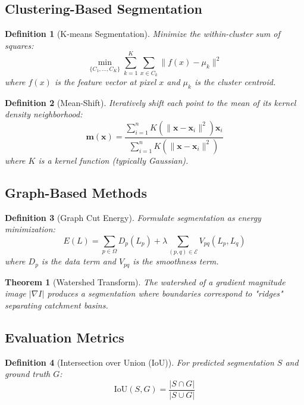 \documentclass[a4paper, 11pt]{article}
\newtheorem{definition}{Definition}[section]
\newtheorem{theorem}{Theorem}[section]
\begin{document}
\subsection{Clustering-Based Segmentation}

\begin{definition}[K-means Segmentation]
Minimize the within-cluster sum of squares:
\begin{equation}
\min_{\{C_1, \ldots, C_K\}} \sum_{k=1}^K \sum_{x \in C_k} \|f(x) - \mu_k\|^2
\end{equation}
where $f(x)$ is the feature vector at pixel $x$ and $\mu_k$ is the cluster centroid.
\end{definition}

\begin{definition}[Mean-Shift]
Iteratively shift each point to the mean of its kernel density neighborhood:
\begin{equation}
\mathbf{m}(\mathbf{x}) = \frac{\sum_{i=1}^n K(\|\mathbf{x} - \mathbf{x}_i\|^2) \mathbf{x}_i}{\sum_{i=1}^n K(\|\mathbf{x} - \mathbf{x}_i\|^2)}
\end{equation}
where $K$ is a kernel function (typically Gaussian).
\end{definition}

\subsection{Graph-Based Methods}

\begin{definition}[Graph Cut Energy]
Formulate segmentation as energy minimization:
\begin{equation}
E(L) = \sum_{p \in \Omega} D_p(L_p) + \lambda \sum_{(p,q) \in \mathcal{E}} V_{pq}(L_p, L_q)
\end{equation}
where $D_p$ is the data term and $V_{pq}$ is the smoothness term.
\end{definition}

\begin{theorem}[Watershed Transform]
The watershed of a gradient magnitude image $|\nabla I|$ produces a segmentation where
boundaries correspond to "ridges" separating catchment basins.
\end{theorem}

\subsection{Evaluation Metrics}

\begin{definition}[Intersection over Union (IoU)]
For predicted segmentation $S$ and ground truth $G$:
\begin{equation}
\text{IoU}(S, G) = \frac{|S \cap G|}{|S \cup G|}
\end{equation}
\end{definition}
\end{document}
